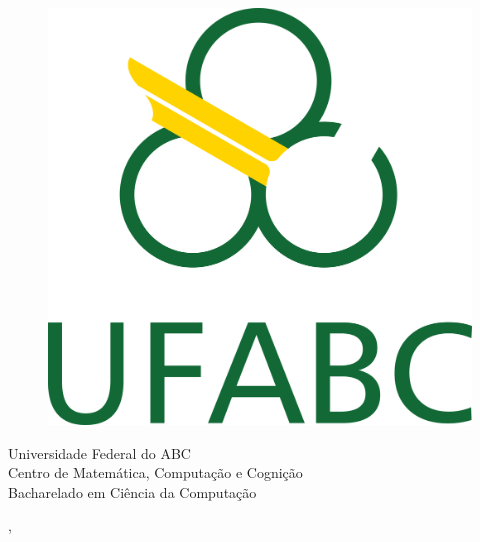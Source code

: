 \begin{capa}%
    \begin{figure}[h!]%
        \centering%
        \includegraphics[scale=1.2]{figs/logo.png}%
    \end{figure}%
    \center \ABNTEXchapterfont\large{Universidade Federal do ABC \\ Centro de Matemática, Computação e Cognição \\ Bacharelado em Ciência da Computação}

    \vfill
    \ABNTEXchapterfont\bfseries\LARGE\imprimirtitulo
    \vfill

    \ABNTEXchapterfont\large\imprimirautor
    \vfill

    \large\imprimirlocal, \large\imprimirdata

    \vspace*{1cm}
\end{capa}
